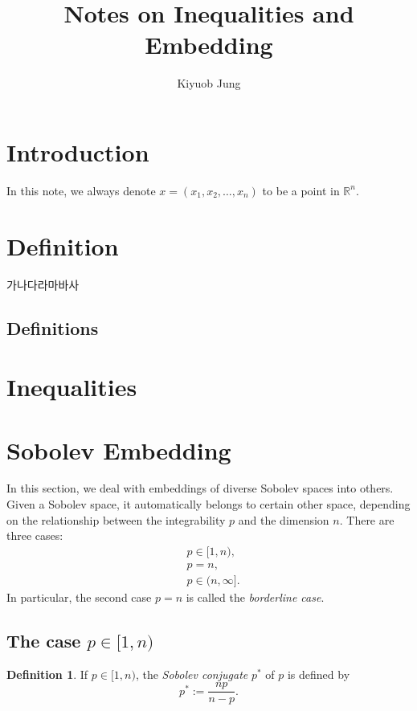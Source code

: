 \documentclass[a4paper,11pt]{article}
\title{
Notes on Inequalities and Embedding}
\author{
Kiyuob Jung}
\theoremstyle{definition}
\newtheorem{definition}[theorem]{Definition}
\begin{document}
\date{}
\maketitle



\section{Introduction}

In this note, we always denote $x=(x_1, x_2, \ldots, x_n)$ to be a point in $\mathbb{R}^{n}$.

\section{Definition}

가나다라마바사

\subsection{Definitions}

\section{Inequalities}

\section{Sobolev Embedding}

In this section, we deal with embeddings of diverse Sobolev spaces into others.
Given a Sobolev space, it automatically belongs to certain other space, depending on the relationship between the integrability $p$ and the dimension $n$.
There are three cases:
\begin{align*}
    &p \in [1, n), \\
    &p = n, \\
    &p \in (n, \infty].
\end{align*}
In particular, the second case $p = n$ is called the \emph{borderline case}. 

\subsection{The case $p \in [1, n)$}

\begin{definition}
    If $p \in [1, n)$, the \emph{Sobolev conjugate} $p^{\ast}$ of $p$ is defined by 
    \begin{equation*} 
        p^{\ast} := \frac{np}{n-p}.
    \end{equation*}
\end{definition}
\end{document}
